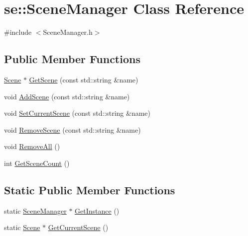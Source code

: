 \hypertarget{classse_1_1_scene_manager}{}\section{se\+:\+:Scene\+Manager Class Reference}
\label{classse_1_1_scene_manager}


{\ttfamily \#include $<$Scene\+Manager.\+h$>$}

\subsection*{Public Member Functions}
\begin{DoxyCompactItemize}
\item 
\mbox{\hyperlink{classse_1_1_scene}{Scene}} $\ast$ \mbox{\hyperlink{classse_1_1_scene_manager_ae43e9c01f5b3804a669b1a7ab89504d8}{Get\+Scene}} (const std\+::string \&name)
\item 
void \mbox{\hyperlink{classse_1_1_scene_manager_a9ad26f193f547285f4eae5c440f24a10}{Add\+Scene}} (const std\+::string \&name)
\item 
void \mbox{\hyperlink{classse_1_1_scene_manager_a8eff0a05036942247f81fe4915ffce50}{Set\+Current\+Scene}} (const std\+::string \&name)
\item 
void \mbox{\hyperlink{classse_1_1_scene_manager_a7912dae18fcbfff00194a63b88aec179}{Remove\+Scene}} (const std\+::string \&name)
\item 
void \mbox{\hyperlink{classse_1_1_scene_manager_a354707c12a744c1f86e9433b312f8203}{Remove\+All}} ()
\item 
int \mbox{\hyperlink{classse_1_1_scene_manager_aac6929d7dfd933c4d40fbf66b3740321}{Get\+Scene\+Count}} ()
\end{DoxyCompactItemize}
\subsection*{Static Public Member Functions}
\begin{DoxyCompactItemize}
\item 
static \mbox{\hyperlink{classse_1_1_scene_manager}{Scene\+Manager}} $\ast$ \mbox{\hyperlink{classse_1_1_scene_manager_a3e70fb156c0abf1fd4f6aa9ceceb0203}{Get\+Instance}} ()
\item 
static \mbox{\hyperlink{classse_1_1_scene}{Scene}} $\ast$ \mbox{\hyperlink{classse_1_1_scene_manager_aee24906248f3b7cb63df4c7411791dc0}{Get\+Current\+Scene}} ()
\end{DoxyCompactItemize}


